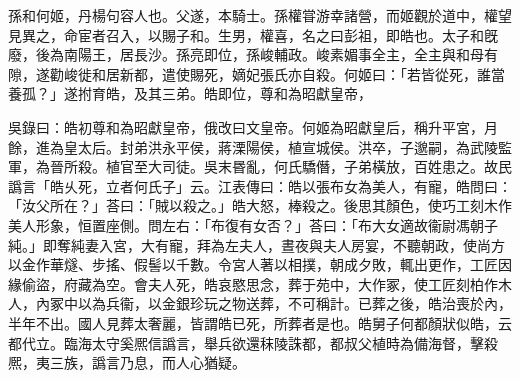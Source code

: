 
\begin{pinyinscope}
孫和何姬，丹楊句容人也。父遂，本騎士。孫權甞游幸諸營，而姬觀於道中，權望見異之，命宦者召入，以賜子和。生男，權喜，名之曰彭祖，即皓也。太子和旣廢，後為南陽王，居長沙。孫亮即位，孫峻輔政。峻素媚事全主，全主與和母有隙，遂勸峻徙和居新都，遣使賜死，嫡妃張氏亦自殺。何姬曰：「若皆從死，誰當養孤？」遂拊育皓，及其三弟。皓即位，尊和為昭獻皇帝，

吳錄曰：皓初尊和為昭獻皇帝，俄改曰文皇帝。何姬為昭獻皇后，稱升平宮，月餘，進為皇太后。封弟洪永平侯，蔣溧陽侯，植宣城侯。洪卒，子邈嗣，為武陵監軍，為晉所殺。植官至大司徒。吳末昬亂，何氏驕僭，子弟橫放，百姓患之。故民譌言「皓乆死，立者何氏子」云。江表傳曰：皓以張布女為美人，有寵，皓問曰：「汝父所在？」荅曰：「賊以殺之。」皓大怒，棒殺之。後思其顏色，使巧工刻木作美人形象，恒置座側。問左右：「布復有女否？」荅曰：「布大女適故衞尉馮朝子純。」即奪純妻入宮，大有寵，拜為左夫人，晝夜與夫人房宴，不聽朝政，使尚方以金作華燧、步搖、假髻以千數。令宮人著以相撲，朝成夕敗，輒出更作，工匠因緣偷盜，府藏為空。會夫人死，皓哀愍思念，葬于苑中，大作冢，使工匠刻柏作木人，內冢中以為兵衞，以金銀珍玩之物送葬，不可稱計。已葬之後，皓治喪於內，半年不出。國人見葬太奢麗，皆謂皓已死，所葬者是也。皓舅子何都顏狀似皓，云都代立。臨海太守奚熈信譌言，舉兵欲還秣陵誅都，都叔父植時為備海督，擊殺熈，夷三族，譌言乃息，而人心猶疑。


\end{pinyinscope}